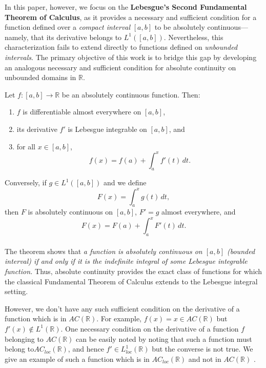 \documentclass{article}
\numberwithin{equation}{section}
{\theoremstyle{break}\newtheorem{theorem}{Theorem}[subsection]}
{\theoremstyle{break}\theorembodyfont{\rmfamily}\newtheorem{example}[theorem]{Example}}
{\theoremstyle{break}\theorembodyfont{\rmfamily}\newtheorem{definition}[theorem]{Definition}}
{\theoremstyle{break}\theorembodyfont{\rmfamily}\newtheorem{notation}[theorem]{Notation}}
{\theoremstyle{break}\theorembodyfont{\rmfamily}\newtheorem{remark}[theorem]{Remark}}
\begin{document}
{{%

\bigskip

\noindent
In this paper, however, we focus on the \textbf{Lebesgue’s Second Fundamental Theorem of Calculus}, as it provides a necessary and sufficient condition for a function defined over a \textit{compact interval} \([a,b]\) to be absolutely continuous—namely, that its derivative belongs to \(L^1([a,b])\). Nevertheless, this characterization fails to extend directly to functions defined on \textit{unbounded intervals}. The primary objective of this work is to bridge this gap by developing an analogous necessary and sufficient condition for absolute continuity on unbounded domains in \(\mathbb{R}\).


Let $f : [a,b] \to \mathbb{R}$ be an absolutely continuous function. Then:
\begin{enumerate}
    \item $f$ is differentiable almost everywhere on $[a,b]$,
    \item its derivative $f'$ is Lebesgue integrable on $[a,b]$, and
    \item for all $x \in [a,b]$,
    \[
    f(x) = f(a) + \int_a^x f'(t)\, dt.
    \]
\end{enumerate}
Conversely, if $g \in L^1([a,b])$ and we define
\[
F(x) = \int_a^x g(t)\, dt,
\]
then $F$ is absolutely continuous on $[a,b]$, $F' = g$ almost everywhere, and
\[
F(x) = F(a) + \int_a^x F'(t)\, dt.
\]
\\The theorem shows that \emph{a function is absolutely continuous on $[a,b]$ (bounded interval) if and only if it is the indefinite integral of some Lebesgue integrable function.} Thus, absolute continuity provides the exact class of functions for which the classical Fundamental Theorem of Calculus extends to the Lebesgue integral setting.


\vspace{0.25cm}However, we don't have any such sufficient condition on the derivative of a function which is in $AC(\mathbb{R})$. For example,
$f(x)=x \in AC(\mathbb{R})$ but $f'(x) \notin L^1(\mathbb{R})$. One necessary condition on the derivative of a function $f$ belonging to $AC(\mathbb{R})$ can be easily noted by noting that such a function must belong to$AC_{loc}(\mathbb{R})$, and hence $f' \in L^1_{loc}(\mathbb{R})$ but the converse is not true. We give an example\cite{book:A} of such a function which is in $AC_{loc}(\mathbb{R})$ and not in $AC(\mathbb{R})$ .\\

}}
\end{document}
